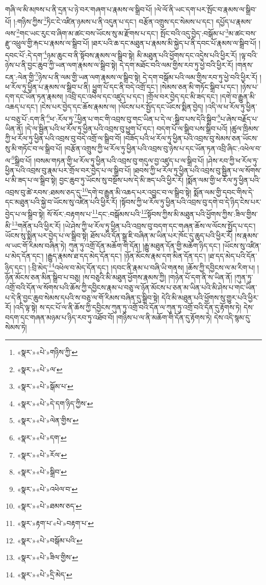 གཞི་ལ་མི་མཁས་པ་ནི་དྲན་པ་ཉེ་བར་གཞག་པ་རྣམས་ལ་སྒྲིབ་པོ། །ལེ་ལོ་ནི་ཡང་དག་པར་སྤོང་བ་རྣམས་ལ་སྒྲིབ་པོ། །:གཉིས་ཀྱིས་\footnote{«སྣར་»«པེ་»གཉིས་ཀྱི་}ཏིང་ངེ་འཛིན་ཉམས་པ་ནི་འདུན་པ་དང་། བརྩོན་འགྲུས་དང་སེམས་པ་དང་། དཔྱོད་པ་རྣམས་ལས་\footnote{«སྣར་»«པེ་»ལ་}གང་ཡང་རུང་བ་ཞིག་མ་ཚང་བས་ཡོངས་སུ་མ་རྫོགས་པ་དང་། སྤོང་བའི་འདུ་བྱེད་:བསྒོམ་པ་\footnote{«སྣར་»«པེ་»སྒོམ་པ་}མ་ཚང་བས་རྫུ་འཕྲུལ་གྱི་རྐང་པ་རྣམས་ལ་སྒྲིབ་པོ། །ཐར་པའི་ཆ་དང་མཐུན་པ་རྣམས་མི་སྐྱེད་པ་ནི་དབང་པོ་རྣམས་ལ་སྒྲིབ་པོ། །དབང་པོ་:དེ་དག་\footnote{«སྣར་»«པེ་»དེ་དག་ཉིད་ཀྱིས་}ཉམ་ཆུང་བ་ནི་སྟོབས་རྣམས་ལ་སྒྲིབ་སྟེ། མི་མཐུན་པའི་ཕྱོགས་དང་འདྲེས་པའི་ཕྱིར་རོ། །ལྟ་བའི་ཉེས་པ་ནི་བྱང་ཆུབ་ཀྱི་ཡན་ལག་རྣམས་ལ་སྒྲིབ་སྟེ། དེ་དག་མཐོང་བའི་ལམ་གྱིས་རབ་ཏུ་ཕྱེ་བའི་ཕྱིར་རོ། །གནས་ངན་:ལེན་གྱི་\footnote{«སྣར་»«པེ་»ལེན་གྱིས་}ཉེས་པ་ནི་ལམ་གྱི་ཡན་ལག་རྣམས་ལ་སྒྲིབ་སྟེ། དེ་དག་བསྒོམ་པའི་ལམ་གྱིས་རབ་ཏུ་ཕྱེ་བའི་ཕྱིར་རོ། །ཕ་རོལ་ཏུ་ཕྱིན་པ་རྣམས་ལ་སྒྲིབ་པ་ནི། ཕྱུག་པོ་དང་ནི་བདེ་འགྲོ་དང་། །སེམས་ཅན་མི་གཏོང་སྒྲིབ་པ་དང་། །ཉེས་པ་དག་དང་ཡོན་ཏན་རྣམས། །འབྲི་དང་འཕེལ་དང་འཛུད་པ་དང་། །གྲོལ་བར་བྱེད་དང་མི་ཟད་དང་། །དགེ་བ་རྒྱུན་མི་འཆད་པ་དང་། །ངེས་པར་བྱེད་དང་ཆོས་རྣམས་ལ། །ལོངས་པར་སྤྱོད་དང་ཡོངས་སྨིན་བྱེད། །འདི་ལ་ཕ་རོལ་ཏུ་ཕྱིན་པ་བཅུ་པོ་:དག་ནི་\footnote{«སྣར་»«པེ་»དག་}ཕ་:རོལ་ཏུ་\footnote{«སྣར་»«པེ་»རོལ་}ཕྱིན་པ་གང་གི་འབྲས་བུ་གང་ཡིན་པ་དེ་ལ་:སྒྲིབ་པས་དེའི་སྒྲིབ་\footnote{«སྣར་»«པེ་»སྒྲིབ་}པ་ཞེས་བརྗོད་པ་ཡིན་ནོ། །དེ་ལ་སྦྱིན་པའི་ཕ་རོལ་ཏུ་ཕྱིན་པའི་འབྲས་བུ་ཕྱུག་པོ་དང་། བདག་པོ་ལ་སྒྲིབ་པས་སྒྲིབ་པའོ། །ཚུལ་ཁྲིམས་ཀྱི་ཕ་རོལ་ཏུ་ཕྱིན་པའི་འབྲས་བུ་བདེ་འགྲོ་ལ་སྒྲིབ་བོ། །བཟོད་པའི་ཕ་རོལ་ཏུ་ཕྱིན་པའི་འབྲས་བུ་སེམས་ཅན་ཡོངས་སུ་མི་གཏོང་བ་ལ་སྒྲིབ་པོ། །བརྩོན་འགྲུས་ཀྱི་ཕ་རོལ་ཏུ་ཕྱིན་པའི་འབྲས་བུ་ཉེས་པ་དང་ཡོན་ཏན་འབྲི་ཞིང་:འཕེལ་བ་ལ་\footnote{«སྣར་»«པེ་»འཕེལ་བ་}སྒྲིབ་པོ། །བསམ་གཏན་གྱི་ཕ་རོལ་ཏུ་ཕྱིན་པའི་འབྲས་བུ་གདུལ་བྱ་འཛུད་པ་ལ་སྒྲིབ་པོ། །ཤེས་རབ་ཀྱི་ཕ་རོལ་ཏུ་ཕྱིན་པའི་འབྲས་བུ་རྣམ་པར་གྲོལ་བར་བྱེད་པ་ལ་སྒྲིབ་པོ། །ཐབས་ཀྱི་ཕ་རོལ་ཏུ་ཕྱིན་པའི་འབྲས་བུ་སྦྱིན་པ་ལ་སོགས་པ་མི་ཟད་པ་ལ་སྒྲིབ་སྟེ། བྱང་ཆུབ་ཏུ་ཡོངས་སུ་བསྔོས་པས་དེ་མི་ཟད་པའི་ཕྱིར་རོ། །སྨོན་ལམ་གྱི་ཕ་རོལ་ཏུ་ཕྱིན་པའི་འབྲས་བུ་ཚེ་རབས་:ཐམས་ཅད་དུ་\footnote{«སྣར་»«པེ་»ཐམས་ཅད་}དགེ་བ་རྒྱུན་མི་འཆད་པར་འབྱུང་བ་ལ་སྒྲིབ་སྟེ། སྨོན་ལམ་གྱི་དབང་གིས་དེ་དང་མཐུན་པའི་སྐྱེ་བ་ཡོངས་སུ་འཛིན་པའི་ཕྱིར་རོ། །སྟོབས་ཀྱི་ཕ་རོལ་ཏུ་ཕྱིན་པའི་འབྲས་བུ་དགེ་བ་དེ་ཉིད་ངེས་པར་བྱེད་པ་ལ་སྒྲིབ་སྟེ། སོ་སོར་:བརྟགས་པ་\footnote{«སྣར་»རྟག་པ་«པེ་»བརྟག་པ་}དང་:བསྒོམས་པའི་\footnote{«སྣར་»«པེ་»བསྒོམ་པའི་}སྟོབས་ཀྱིས་མི་མཐུན་པའི་ཕྱོགས་ཀྱིས་:ཟིལ་གྱིས་མི་\footnote{«སྣར་»«པེ་»ཟིལ་གྱིས་}གནོན་པའི་ཕྱིར་རོ། །ཡེ་ཤེས་ཀྱི་ཕ་རོལ་ཏུ་ཕྱིན་པའི་འབྲས་བུ་བདག་དང་གཞན་ཆོས་ལ་ལོངས་སྤྱོད་པ་དང་། ཡོངས་སུ་སྨིན་པར་བྱེད་པ་ལ་སྒྲིབ་སྟེ། ཐོས་པའི་དོན་སྒྲ་ཇི་བཞིན་མ་ཡིན་པར་ཁོང་དུ་ཆུད་པའི་ཕྱིར་རོ། །ས་རྣམས་ལ་ཡང་གོ་རིམས་བཞིན་ཏེ། ཀུན་ཏུ་འགྲོ་དོན་མཆོག་གི་དོན། །རྒྱུ་མཐུན་དོན་གྱི་མཆོག་ཉིད་དང་། །ཡོངས་སུ་འཛིན་པ་མེད་དོན་དང་། །རྒྱུད་རྣམས་ཐ་དད་མེད་དོན་དང་། །ཉོན་མོངས་རྣམ་དག་མིན་དོན་དང་། །ཐ་དད་མེད་པའི་དོན་ཉིད་དང་། །:བྲི་མེད་\footnote{«སྣར་»«པེ་»དྲི་མེད་}འཕེལ་བ་མེད་དོན་དང་། །དབང་ནི་རྣམ་པ་བཞི་ཡི་གནས། །ཆོས་ཀྱི་དབྱིངས་ལ་མ་རིག་པ། །ཉོན་མོངས་ཅན་མིན་སྒྲིབ་པ་བཅུ། །ས་བཅུའི་མི་མཐུན་ཕྱོགས་རྣམས་ཀྱི། །གཉེན་པོ་དག་ནི་ས་ཡིན་ནོ། །ཀུན་ཏུ་འགྲོ་བའི་དོན་ལ་སོགས་པའི་ཆོས་ཀྱི་དབྱིངས་རྣམ་པ་བཅུ་ལ་ཉོན་མོངས་པ་ཅན་མ་ཡིན་པའི་མི་ཤེས་པ་གང་ཡིན་པ་དེ་ནི་བྱང་ཆུབ་སེམས་དཔའི་ས་བཅུ་ལ་གོ་རིམས་བཞིན་དུ་སྒྲིབ་སྟེ། དེའི་མི་མཐུན་པའི་ཕྱོགས་སུ་གྱུར་པའི་ཕྱིར་རོ། །འདི་ལྟ་སྟེ། ས་དང་པོ་ལ་ནི་ཆོས་ཀྱི་དབྱིངས་ཀུན་ཏུ་འགྲོ་བའི་དོན་ལ་ཀུན་ཏུ་འགྲོ་བའི་དོན་དུ་རྟོགས་ཏེ། དེས་བདག་དང་གཞན་མཉམ་པ་ཉིད་རབ་ཏུ་འཐོབ་བོ། །གཉིས་པ་ལ་ནི་མཆོག་གི་དོན་དུ་རྟོགས་ཏེ། དེས་འདི་སྙམ་དུ་སེམས་ཏེ། 